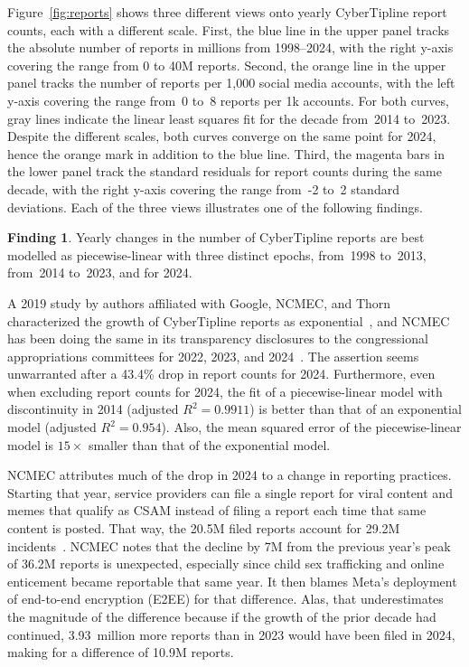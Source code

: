 \documentclass[anonymous,nonacm,screen,12pt]{acmart}
\newcommand\V[1]{{#1}}
\newcommand\V[1]{\textsc{\MakeLowercase{#1}}}
\theoremstyle{definition}
\newtheorem{finding}{Finding}
\begin{document}
Figure~\ref{fig:reports} shows three different views onto yearly CyberTipline
report counts, each with a different scale. First, the blue line in the upper
panel tracks the absolute number of reports in millions from 1998--2024, with
the right y-axis covering the range from 0 to 40\V{M} reports. Second, the
orange line in the upper panel tracks the number of reports per 1,000 social
media accounts, with the left y-axis covering the range from~0 to~8 reports per
1k accounts. For both curves, gray lines indicate the linear least squares fit
for the decade from~2014 to~2023. Despite the different scales, both curves
converge on the same point for 2024, hence the orange mark in addition to the
blue line. Third, the magenta bars in the lower panel track the standard
residuals for report counts during the same decade, with the right y-axis
covering the range from~-2 to~2 standard deviations. Each of the three views
illustrates one of the following findings.


\begin{finding}
Yearly changes in the number of CyberTipline reports are best modelled as
piecewise-linear with three distinct epochs, from~1998 to~2013, from~2014
to~2023, and for 2024.
\end{finding}

\noident{}A 2019 study by authors affiliated with Google, \V{NCMEC}, and Thorn
characterized the growth of CyberTipline reports as
exponential~\cite{BurszteinBrightea2019}, and \V{NCMEC} has been doing the same
in its transparency disclosures to the congressional appropriations committees
for 2022, 2023, and 2024~\cite{NcmecOjjdp2022, NcmecOjjdp2023, NcmecOjjdp2024}.
The assertion seems unwarranted after a 43.4\% drop in report counts for 2024.
Furthermore, even when excluding report counts for 2024, the fit of a
piecewise-linear model with discontinuity in 2014 (adjusted $R^2 = 0.9911$) is
better than that of an exponential model (adjusted $R^2 = 0.954$). Also, the
mean squared error of the piecewise-linear model is $15\times$ smaller than that
of the exponential model.

\V{NCMEC} attributes much of the drop in 2024 to a change in reporting
practices. Starting that year, service providers can file a single report for
viral content and memes that qualify as \V{CSAM} instead of filing a report each
time that same content is posted. That way, the 20.5\V{M} filed reports account
for 29.2\V{M} incidents~\cite{NcmecCyberTipline2024}. \V{NCMEC} notes that the
decline by 7\V{M} from the previous year's peak of 36.2\V{M} reports is
unexpected, especially since child sex trafficking and online enticement became
reportable that same year. It then blames Meta's deployment of end-to-end
encryption (\V{E2EE}) for that difference. Alas, that underestimates the
magnitude of the difference because if the growth of the prior decade had
continued, 3.93~million more reports than in 2023 would have been filed in 2024,
making for a difference of 10.9\V{M} reports.
\end{document}
